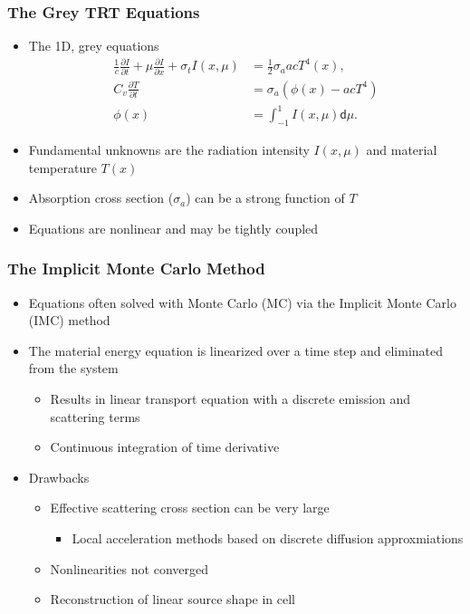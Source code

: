 \documentclass[xcolor=dvipsnames,hyperref={pdfpagelabels=false},unknownkeysallowed]{beamer}
\newlength{\wideitemsep}
\let\olditem\item
\renewcommand{\item}{\setlength{\itemsep}{\wideitemsep}\olditem}
\newcommand{\pderiv}[2]{\frac{\partial #1}{\partial #2}}
\renewcommand{\d}{\mathsf{d}}
\begin{document}
\begin{frame}
\frametitle{The Grey TRT Equations}
\begin{itemize}
\item The 1D, grey equations
\begin{align*}\label{ho_cont}
    \frac{1}{c}\pderiv{I}{t} + \mu \pderiv{I}{x} + \sigma_t I(x,\mu)
    &= \frac{1}{2} \sigma_a a c T^4(x),
  \\
  C_v \pderiv{T}{t} &=  \sigma_a \left(\phi(x) - a c T^4\right) \\
   \phi(x) &= \int_{-1}^1 I(x,\mu) \d \mu.
\end{align*}
        \item Fundamental unknowns are the radiation intensity $I(x,\mu)$ and material
            temperature $T(x)$
        \item \pause Absorption cross section ($\sigma_a$) can be a strong function of $T$
        \item Equations are nonlinear and may be tightly coupled 
\end{itemize}

\end{frame}

\begin{frame}
\frametitle{The Implicit Monte Carlo Method}
\begin{itemize}
\item Equations often solved with Monte Carlo (MC) via the Implicit Monte Carlo (IMC) method
\item The material energy equation is linearized over a time step and eliminated from the system
    \begin{itemize}
        \item Results in linear transport equation with a discrete emission and scattering terms
\item Continuous integration of time derivative
    \end{itemize}
    \pause
\item Drawbacks 
\begin{itemize}
\item Effective scattering cross section can be very large 
    \begin{itemize}
        \item Local acceleration methods based on discrete diffusion approxmiations
    \end{itemize}
\item Nonlinearities not converged
\item Reconstruction of linear source shape in cell
\end{itemize}
\end{itemize}
\end{frame}
\end{document}
